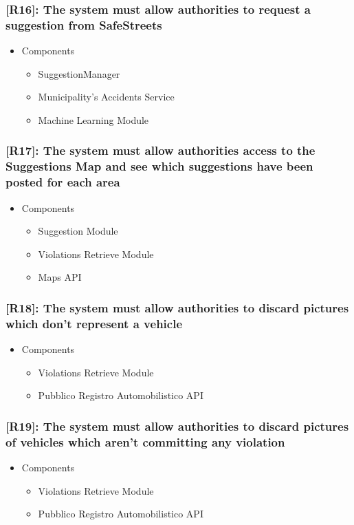 \documentclass[12pt,a4paper]{article}
\begin{document}
\subsubsection*{[R16]: The system must allow authorities to request a suggestion from SafeStreets}
\begin{itemize}
\item Components
\begin{itemize}
\item SuggestionManager
\item Municipality's Accidents Service
\item Machine Learning Module
\end{itemize}
\end{itemize}
\subsubsection*{[R17]: The system must allow authorities access to the Suggestions Map and see which suggestions have been posted for each area}
\begin{itemize}
\item Components
\begin{itemize}
\item Suggestion Module
\item Violations Retrieve Module
\item Maps API
\end{itemize}
\end{itemize}
\subsubsection*{[R18]: The system must allow authorities to discard pictures which don't represent a vehicle}
\begin{itemize}
\item Components
\begin{itemize}
\item Violations Retrieve Module
\item Pubblico Registro Automobilistico API 
\end{itemize}
\end{itemize}
\subsubsection*{[R19]: The system must allow authorities to discard pictures of vehicles which aren't committing any violation}
\begin{itemize}
\item Components
\begin{itemize}
\item Violations Retrieve Module
\item Pubblico Registro Automobilistico API 
\end{itemize}
\end{itemize}
\end{document}
